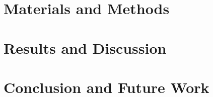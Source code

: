 \documentclass[a4paper]{book}
\begin{document}
\chapter{Materials and Methods}









\chapter{Results and Discussion}



\chapter{Conclusion and Future Work}



\backmatter%



\end{document}
